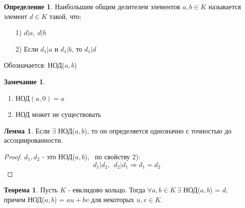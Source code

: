 \documentclass[a4paper, 12pt]{article}
\newcommand\tab[1][.5cm]{\hspace*{#1}}
\theoremstyle{definition}
\newtheorem*{definition}{Определение}
\newtheorem*{theorem}{Теорема}
\newtheorem*{lemma}{Лемма}
\newtheorem*{remark}{Замечание}
\begin{document}
  \begin{definition}
    Наибольшим общим делителем элементов $a,b \in K$ называется элемент $d \in K$ такой, что: 
    \begin{enumerate}
      \item[1)] $d|a, \ d|b$
      \item[2)] Если $d_1|a$ и $d_1|b$, то $d_1|d$     
    \end{enumerate}
    Обозначается: НОД($a,b$) 
  \end{definition}
  \begin{remark}\tab
    \begin{enumerate}
      \item НОД$(a,0) = a$
      \item НОД может не существовать
    \end{enumerate}
  \end{remark}
  \begin{lemma}
    Если $\exists$ НОД($a,b$), то он определяется однозначно с точностью до ассоциированности.
  \end{lemma}
  \begin{proof}
    $d_1, d_2$ - это НОД($a,b$), \ по свойству 2): 
    $$d_1|d_2, \ \ d_2|d_1 \Longrightarrow d_1 = d_2$$   
  \end{proof}
  \begin{theorem}
    Пусть $K$ - евклидово кольцо. Тогда $\forall a, b \in K \ \exists$ НОД($a,b$) = $d$, причем НОД($a,b$) = $au + bv$ для некоторых $u, v \in K$.     
  \end{theorem}
\end{document}
